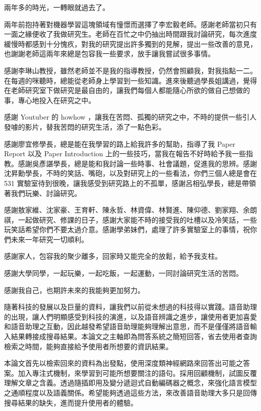 \NTUtitlepage  %

\newpage
\setcounter{page}{1}

\NTUoralpage  %

\mydoublespacing
\begin{acknowledgement} %
兩年多的時光，一轉眼就過去了。

   兩年前抱持著對機器學習這塊領域有憧憬而選擇了李宏毅老師。感謝老師當初只有一面之緣便收了我做研究生。老師在百忙之中仍抽出時間跟我討論研究，每次進度緩慢時都感到十分愧疚，對我的研究提出許多獨到的見解，提出一些改善的意見，也謝謝老師這兩年來總是包容我一些要求，放手讓我嘗試很多事情。

   感謝李琳山教授，雖然老師並不是我的指導教授，仍然會照顧我，對我指點一二。在每週的咪聽時，總能從老師身上學習到一些知識。進來後聽過學長姐講過，覺得在老師研究室下做研究是最自由的，讓我們每個人都能隨心所欲的做自己想做的事，專心地投入在研究之中。

   感謝 Youtuber 的 howhow ，讓我在苦悶、孤獨的研究之中，不時的提供一些引人發噱的影片，替我苦悶的研究生活，添了一點色彩。

   感謝廖宜修學長，總是能在我學習的路上給我許多的幫助，指導了我 Paper Report 以及 Paper Introduction 上的一些技巧，當我在報告不好時給予我一些指教。感謝吳彥諶學長，總是能和我討論一些時事、社會議題，促進我的思辨。感謝沈昇勳學長，不時的笑話、嘴砲，以及對研究上的一些看法，你們三個人總是會在 531 實驗室待到很晚，讓我感受到研究路上的不孤單，感謝呂相弘學長，總是帶領著我們玩樂、討論研究。

   感謝敖家維、沈家豪、王育軒、陳永哲、林資偉、林賢進、陳仰德、劉家翔、余朗祺，一起做研究、修課的日子，感謝大家能不時的接受我的吐槽以及冷笑話，一些玩笑話希望你們不要太過介意。感謝學弟妹們，處理了許多實驗室上的事情，祝你們未來一年研究一切順利。
   
   感謝家人，包容我的聚少離多，回家時又能完全的放鬆，給予我支柱。

   感謝大學同學，一起玩樂，一起吃飯，一起運動，一同討論研究生活的苦悶。

   感謝我自己，也期許未來的我能夠更加努力。
\end{acknowledgement}

\begin{zhAbstract}  %
    隨著科技的發展以及巨量的資料，讓我們以前從未想過的科技得以實踐。語音助理的出現，讓人們明顯感受到科技的演進，以及語音辨識之進步，讓使用者更加喜愛和語音助理之互動，因此越發希望語音助理能夠理解出意思，而不是僅僅將語音輸入結果轉接成搜尋結果。本論文之主軸即為問答系統之簡短回答，省去使用者查詢檢索之時間，能夠直接給予使用者所想要的資訊結果。

    本論文首先以檢索回來的資料為出發點，使用深度類神經網路來回答出可能之答案。加入專注式機制，來學習到可能所想要關注的語句。採用回顧機制，試圖反覆理解文章之含義。透過隨插即用及變分遞迴式自動編碼器之概念，來強化語言模型之通順程度以及語義關係。希望能夠透過這些方法，來改善語音助理大多只是回傳搜尋結果的缺失，進而提升使用者的體驗。
\end{zhAbstract}

{
\mysinglespacing\selectfont
\tableofcontents %

\listoffigures  %

\listoftables  %
\par
}

\newpage
\setcounter{page}{1}
